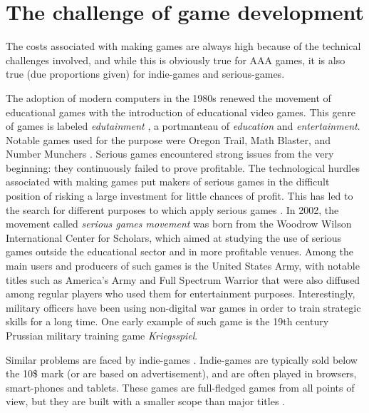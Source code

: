 \section{The challenge of game development}

The costs associated with making games are always high because of the technical challenges involved, and while this is obviously true for AAA games, it is also true (due proportions given) for indie-games and serious-games.

The adoption of modern computers in the 1980s renewed the movement of educational games with the introduction of educational video games. This genre of games is labeled \textit{edutainment} \cite{CHAPTER_1_EDUTAINMENT}, a portmanteau of \textit{education} and \textit{entertainment}. Notable games used for the purpose were Oregon Trail, Math Blaster, and Number Munchers \cite{CHAPTER_1_OLD_EDUCATIONAL_VIDEOGAMES}. Serious games encountered strong issues from the very beginning: they continuously failed to prove profitable. The technological hurdles associated with making games put makers of serious games in the difficult position of risking a large investment for little chances of profit. This has led to the search for different purposes to which apply serious games \cite{CHAPTER_1_APPLICATIONS_OF_SERIOUS_GAMES}. In 2002, the movement called \textit{serious games movement} was born from the Woodrow Wilson International Center for Scholars, which aimed at studying the use of serious games outside the educational sector and in more profitable venues. Among the main users and producers of such games is the United States Army, with notable titles such as America's Army and Full Spectrum Warrior that were also diffused among regular players who used them for entertainment purposes. Interestingly, military officers have been using non-digital war games in order to train strategic skills for a long time. One early example of such game is the 19th century Prussian military training game \textit{Kriegsspiel}.

Similar problems are faced by indie-games \cite{CHAPTER_1_ISSUES_WITH_INDIE_GAMES}. Indie-games are typically sold below the 10\$ mark (or are based on advertisement), and are often played in browsers, smart-phones and tablets. These games are full-fledged games from all points of view, but they are built with a smaller scope than major titles \cite{CHAPTER_1_INDIE_GAMES_SIZE}.

